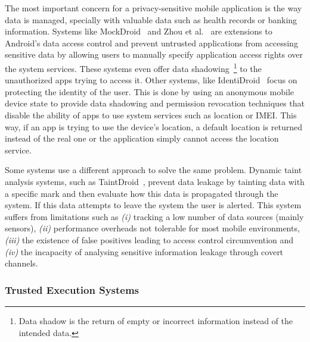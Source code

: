The most important concern for a privacy-sensitive mobile application is the way data is managed, specially with valuable data such as health records or banking information. Systems like MockDroid~\cite{beresford2011mockdroid} and Zhou et al.~\cite{zhou2011taming} are extensions to Android's data access control and prevent untrusted applications from accessing sensitive data by allowing users to manually specify application access rights over the system services.
These systems even offer data shadowing~\footnote{Data shadow is the return of empty or incorrect information instead of the intended data.} to the unauthorized apps trying to access it.
Other systems, like IdentiDroid~\cite{shebaro2014identidroid} focus on protecting the identity of the user. This is done by using an anonymous mobile device state to provide data shadowing and permission revocation techniques that disable the ability of apps to use system services such as location or \ac{IMEI}. This way, if an app is trying to use the device's location, a default location is returned instead of the real one or the application simply cannot access the location service.

Some systems use a different approach to solve the same problem. Dynamic taint analysis systems, such as TaintDroid~\cite{enck2014taintdroid}, prevent data leakage by tainting data with a specific mark and then evaluate how this data is propagated through the system. If this data attempts to leave the system the user is alerted. This system suffers from limitations such as \emph{(i)} tracking a low number of data sources (mainly sensors), \emph{(ii)} performance overheads not tolerable for most mobile environments, \emph{(iii)} the existence of false positives leading to access control circumvention and \emph{(iv)} the incapacity of analysing sensitive information leakage through covert channels.


\subsubsection{Trusted Execution Systems}
\label{sec:tee}


